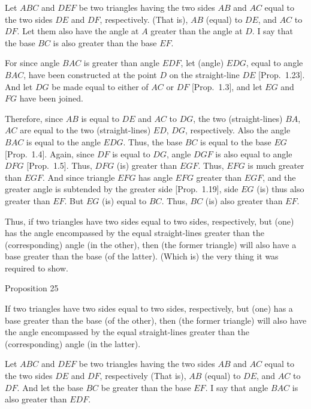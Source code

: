\epsfysize=2in
\centerline{}

Let  $ABC$ and $DEF$ be two triangles having the two sides $AB$ and $AC$
equal to the two sides $DE$ and $DF$, respectively. (That is), $AB$ (equal) to $DE$, and
$AC$ to $DF$.  Let them also have the angle at $A$ greater than the angle at $D$.
I say that the base $BC$ is also greater than the base $EF$.

For since angle $BAC$ is greater than angle $EDF$, let (angle) $EDG$, equal to
angle $BAC$,  have been constructed at  the point $D$ on the straight-line $DE$ [Prop.~1.23]. And let $DG$ be made equal to either of $AC$ or $DF$ [Prop.~1.3], and let $EG$ and $FG$ have been joined.

Therefore, since $AB$ is equal to $DE$ and $AC$ to $DG$, the two (straight-lines)
$BA$, $AC$ are equal to the two (straight-lines) $ED$, $DG$, respectively.
Also the angle $BAC$ is equal to the angle $EDG$. Thus, the base $BC$ is equal
to the base $EG$ [Prop.~1.4]. Again, since $DF$ is equal to $DG$, angle $DGF$
is also equal to angle $DFG$ [Prop.~1.5]. Thus, $DFG$ (is) greater than $EGF$.
Thus, $EFG$ is much greater than $EGF$. And since triangle $EFG$ has angle $EFG$
greater than $EGF$, and the greater angle is subtended by the greater side [Prop.~1.19], side $EG$ (is) thus also greater than $EF$. But $EG$ (is) equal to
$BC$. Thus, $BC$ (is) also greater than $EF$.

Thus, if two triangles have two sides equal to two sides, respectively,
but (one) has the angle encompassed by the equal straight-lines greater than the 
(corresponding) angle (in the other), then (the former triangle) will also have a base greater than the base (of the latter).
(Which is) the very thing it was required to show.


\begin{center}
{\large Proposition 25}
\end{center}

If two triangles have two sides equal to two sides, respectively,
but (one) has a base greater than the base (of the other), then (the former triangle) will also have the angle encompassed by the equal straight-lines greater than the (corresponding) angle (in the latter).

\epsfysize=2in
\centerline{}

Let $ABC$ and $DEF$ be  two triangles having the two sides $AB$ and $AC$
equal to the two sides $DE$ and $DF$, respectively (That is), $AB$ (equal) to $DE$, and $AC$ to $DF$. And let the base $BC$ be greater than the base $EF$. I say that angle
$BAC$ is also greater than $EDF$.

